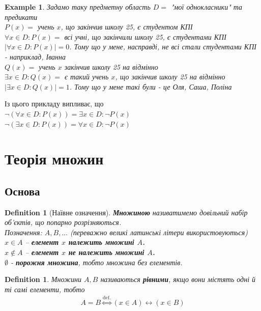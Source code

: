 \documentclass[a4paper, 14pt]{extarticle}
\theoremstyle{theoremdd}
\theoremstyle{theoremdd}
\newtheorem{definition}[theorem]{Definition}
\theoremstyle{theoremdd}
\theoremstyle{theoremdd}
\theoremstyle{theoremdd}
\newtheorem{example}[theorem]{Example}
\theoremstyle{theoremdd}
\theoremstyle{theoremdd}
\theoremstyle{theoremdd}
\theoremstyle{theoremdd}
\theoremstyle{theoremdd}
\theoremstyle{theoremdd}
\theoremstyle{theoremdd}
\theoremstyle{theoremdd}
\theoremstyle{theoremdd}
\theoremstyle{theoremdd}
\begin{document}
\begin{example}
Задамо таку предметну область $D = $ "мої однокласники" та предикати\\
$P(x) = $ учень $x$, що закінчив школу 25, є студентом КПІ\\
$\forall x \in D: P(x) = $ всі учні, що закінчили школу 25, є студентами КПІ\\
$|\forall x \in D: P(x)| = 0$. Тому що у мене, насправді, не всі стали студентами КПІ - наприклад, Іванна\\
$Q(x) = $ учень $x$ закінчив школу 25 на відмінно\\
$\exists x \in D: Q(x) =$ є такий учень $x$, що закінчив школу 25 на відмінно\\
$|\exists x \in D: Q(x)| = 1$. Тому що у мене такі були - це Оля, Саша, Поліна
\end{example}

Із цього прикладу випливає, що\\
$\neg (\forall x \in D: P(x)) = \exists x \in D: \neg P(x)$\\
$\neg (\exists x \in D: P(x)) = \forall x \in D: \neg P(x)$\\
\newpage

\section{Теорія множин}
\subsection{Основа}
\begin{definition}[Наївне означення]
\textbf{Множиною} називатимемо довільний набір об'єктів, що попарно розрізняються.\\
Позначення: $A,B,\dots$ (переважно великі латинські літери використовуються)
\bigskip \\
$x \in A$ -- \textbf{елемент $x$ належить множині $A$.}\\
$x \not\in A$ -- \textbf{елемент $x$ не належить множині $A$.}\\
$\emptyset$ - \textbf{порожня множина}, тобто множина без елементів.
\end{definition}

\begin{definition}
Множини $A,B$ називаються \textbf{рівними}, якщо вони містять одні й ті самі елементи, тобто
\begin{align*}
A = B \overset{\text{def.}}{\iff} (x \in A) \leftrightarrow (x \in B)
\end{align*}
\end{definition}
\end{document}
